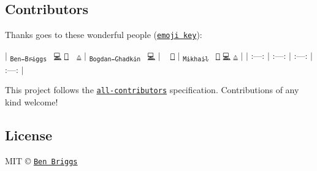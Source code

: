 \subsection*{Contributors}

Thanks goes to these wonderful people (\href{https://github.com/kentcdodds/all-contributors#emoji-key}{\tt emoji key})\+:

$\vert$ \href{http://beneb.info}{\tt \textsubscript{Ben Briggs}}~\newline
\href{https://github.com/ben-eb/postcss-minify-gradients/commits?author=ben-eb}{\tt 💻} \href{https://github.com/ben-eb/postcss-minify-gradients/commits?author=ben-eb}{\tt 📖} 👀 \href{https://github.com/ben-eb/postcss-minify-gradients/commits?author=ben-eb}{\tt ⚠️} $\vert$ \href{https://github.com/TrySound}{\tt \textsubscript{Bogdan Chadkin}}~\newline
\href{https://github.com/ben-eb/postcss-minify-gradients/commits?author=TrySound}{\tt 💻} $\vert$ \href{https://github.com/huan086}{\tt \textsubscript{}}~\newline
\href{https://github.com/ben-eb/postcss-minify-gradients/issues?q=author%3Ahuan086}{\tt 🐛} $\vert$ \href{https://github.com/jaybekster}{\tt \textsubscript{Mikhail}}~\newline
\href{https://github.com/ben-eb/postcss-minify-gradients/issues?q=author%3Ajaybekster}{\tt 🐛} \href{https://github.com/ben-eb/postcss-minify-gradients/commits?author=jaybekster}{\tt 💻} \href{https://github.com/ben-eb/postcss-minify-gradients/commits?author=jaybekster}{\tt ⚠️} $\vert$ $\vert$ \+:---\+: $\vert$ \+:---\+: $\vert$ \+:---\+: $\vert$ \+:---\+: $\vert$

This project follows the \href{https://github.com/kentcdodds/all-contributors}{\tt all-\/contributors} specification. Contributions of any kind welcome!

\subsection*{License}

M\+IT © \href{http://beneb.info}{\tt Ben Briggs} 